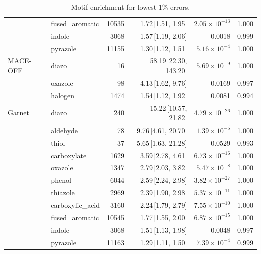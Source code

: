 \begin{table}[t]
\begin{tabular}{llrrrr}
      & fused\_aromatic & 10535 & 1.72\,[1.51, 1.95] & $2.05\times 10^{-13}$ & 1.000 \\
      & indole & 3068 & 1.57\,[1.19, 2.06] & 0.0018 & 0.999 \\
      & pyrazole & 11155 & 1.30\,[1.12, 1.51] & $5.16\times 10^{-4}$ & 1.000 \\
    \hline
    MACE-OFF & diazo & 16 & 58.19\,[22.30, 143.20] & $5.69\times 10^{-9}$ & 1.000 \\
      & oxazole & 98 & 4.13\,[1.62, 9.76] & 0.0169 & 0.997 \\
      & halogen & 1474 & 1.54\,[1.12, 1.92] & 0.0081 & 0.994 \\
    \hline
    Garnet & diazo & 240 & 15.22\,[10.57, 21.82] & $4.79\times 10^{-26}$ & 1.000 \\
      & aldehyde & 78 & 9.76\,[4.61, 20.70] & $1.39\times 10^{-5}$ & 1.000 \\
      & thiol & 37 & 5.65\,[1.63, 21.28] & 0.0529 & 0.993 \\
      & carboxylate & 1629 & 3.59\,[2.78, 4.61] & $6.73\times 10^{-16}$ & 1.000 \\
      & oxazole & 1347 & 2.79\,[2.03, 3.82] & $5.47\times 10^{-8}$ & 1.000 \\
      & phenol & 6044 & 2.59\,[2.24, 2.98] & $3.82\times 10^{-27}$ & 1.000 \\
      & thiazole & 2969 & 2.39\,[1.90, 2.98] & $5.37\times 10^{-11}$ & 1.000 \\
      & carboxylic\_acid & 3160 & 2.24\,[1.79, 2.79] & $7.55\times 10^{-10}$ & 1.000 \\
      & fused\_aromatic & 10545 & 1.77\,[1.55, 2.00] & $6.87\times 10^{-15}$ & 1.000 \\
      & indole & 3068 & 1.51\,[1.13, 1.98] & 0.0048 & 0.997 \\
      & pyrazole & 11163 & 1.29\,[1.11, 1.50] & $7.39\times 10^{-4}$ & 0.999 \\
    \hline
  \end{tabular}
  \caption{Motif enrichment for lowest 1\% errors.}
  \label{tab:split_tfd_best}
\end{table}